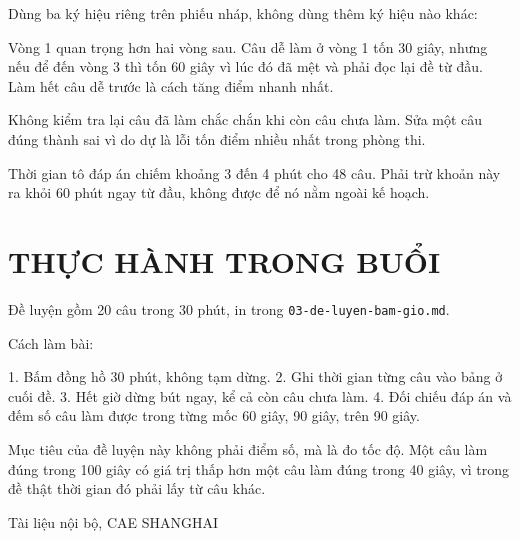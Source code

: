 \documentclass[11pt, a4paper]{article}
\begin{document}
\begin{dinhly}
Dùng ba ký hiệu riêng trên phiếu nháp, không dùng thêm ký hiệu nào khác:


 Vòng 1 quan trọng hơn hai vòng sau. Câu dễ làm ở vòng 1 tốn 30 giây, nhưng nếu để đến vòng 3 thì tốn 60 giây vì lúc đó đã mệt và phải đọc lại đề từ đầu. Làm hết câu dễ trước là cách tăng điểm nhanh nhất.

 Không kiểm tra lại câu đã làm chắc chắn khi còn câu chưa làm. Sửa một câu đúng thành sai vì do dự là lỗi tốn điểm nhiều nhất trong phòng thi.

 Thời gian tô đáp án chiếm khoảng 3 đến 4 phút cho 48 câu. Phải trừ khoản này ra khỏi 60 phút ngay từ đầu, không được để nó nằm ngoài kế hoạch.

\end{dinhly}
\section{THỰC HÀNH TRONG BUỔI}

Đề luyện gồm 20 câu trong 30 phút, in trong \texttt{03-de-luyen-bam-gio.md}.

Cách làm bài:

1. Bấm đồng hồ 30 phút, không tạm dừng.
2. Ghi thời gian từng câu vào bảng ở cuối đề.
3. Hết giờ dừng bút ngay, kể cả còn câu chưa làm.
4. Đối chiếu đáp án và đếm số câu làm được trong từng mốc 60 giây, 90 giây, trên 90 giây.

 Mục tiêu của đề luyện này không phải điểm số, mà là đo tốc độ. Một câu làm đúng trong 100 giây có giá trị thấp hơn một câu làm đúng trong 40 giây, vì trong đề thật thời gian đó phải lấy từ câu khác.
\vspace{0.8cm}
\begin{center}
{\footnotesize\color{cae_blue} Tài liệu nội bộ, CAE SHANGHAI}
\end{center}
\end{document}
